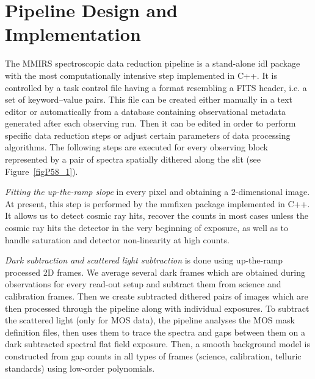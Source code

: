 \section{Pipeline Design and Implementation}

The MMIRS spectroscopic data reduction pipeline is a stand-alone {\sc {}idl} package with the most computationally intensive step implemented in {\sc {}C++}.  It is controlled by a task control file having a format resembling a FITS header, i.e.  a set of keyword--value pairs.  This file can be created either manually in a text editor or automatically from a database containing observational metadata generated after each observing run.  Then it can be edited in order to perform specific data reduction steps or adjust certain parameters of data processing algorithms.  The following steps are executed for every observing block represented by a pair of spectra spatially dithered along the slit (see Figure~\ref{figP58_1}).

 \emph{Fitting the up-the-ramp slope} in every pixel and obtaining a 2-dimensional image. At present, this step is performed by the {\sc {}mmfixen} package implemented in {\sc {}C++}. It allows us to detect cosmic ray hits, recover the counts in most cases unless the cosmic ray hits the detector in the very beginning of exposure, as well as to handle saturation and detector non-linearity at high counts.

 \emph{Dark subtraction and scattered light subtraction} is done using up-the-ramp processed 2D frames.  We average several dark frames which are obtained during observations for every read-out setup and subtract them from science and calibration frames.  Then we create subtracted dithered pairs of images which are then processed through the pipeline along with individual exposures.  To subtract the scattered light (only for MOS data), the pipeline analyses the MOS mask definition files, then uses them to trace the spectra and gaps between them on a dark subtracted spectral flat field exposure.  Then, a smooth background model is constructed from gap counts in all types of frames (science, calibration, telluric standards) using low-order polynomials.

